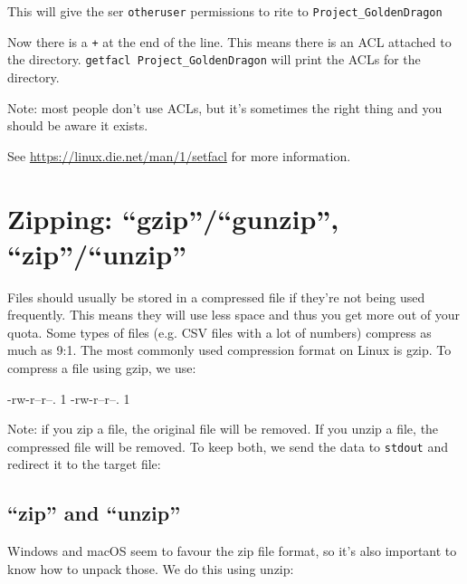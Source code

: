 This will give the ser \verb|otheruser| permissions to rite
to \verb|Project_GoldenDragon|

Now there is a \verb|+| at the end of the line. This means there is an ACL attached
to the directory. \verb|getfacl Project_GoldenDragon| will print the ACLs for the
directory.

Note: most people don't use ACLs, but it's sometimes the right thing and you
should be aware it exists.

See \url{https://linux.die.net/man/1/setfacl} for more information.

\section{Zipping: ``gzip''/``gunzip'', ``zip''/``unzip''}

Files should usually be stored in a compressed file if they're not being used
frequently. This means they will use less space and thus you get more out of
your quota. Some types of files (e.g. CSV files with a lot of numbers) compress
as much as 9:1. The most commonly used compression format on Linux is gzip. To
compress a file using gzip, we use:

\begin{prompt}
    -rw-r--r--. 1 %
    -rw-r--r--. 1 %
\end{prompt}

Note: if you zip a file, the original file will be removed. If you unzip a file,
the compressed file will be removed. To keep both, we send the data to
\verb|stdout| and redirect it to the target file:

\begin{prompt}
\end{prompt}

\subsection{``zip'' and ``unzip''}

Windows and macOS seem to favour the zip file format, so it's also important to
know how to unpack those. We do this using unzip:

\begin{prompt}
\end{prompt}

